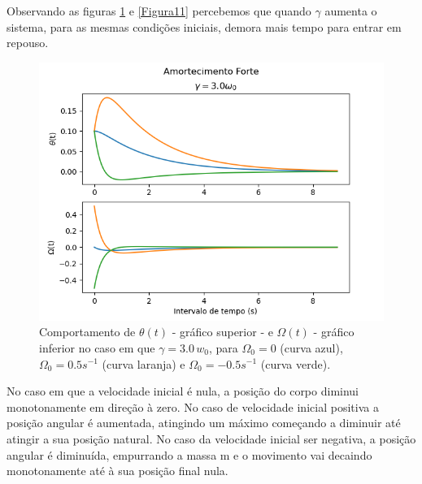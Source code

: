 \documentclass[12pt,openright,twoside,english,brazil]{abntex2}
\begin{document}
Observando as figuras \ref{Figura10} e \ref{Figura11} percebemos que quando $\gamma$ aumenta o sistema, para as mesmas condições iniciais, demora mais tempo para entrar em repouso.
    
\begin{figure}[h]
 \centering
 \includegraphics[width=1.0\linewidth]{forte-1.png}
 \caption{Comportamento de $\theta(t)$ - gráfico superior - e $\Omega(t)$ - gráfico inferior no caso em que $\gamma = 3.0\,  w_0$, para $\Omega_0=0$ (curva azul), $\Omega_0=0.5 s^{-1}$ (curva laranja) e $\Omega_0=-0.5 s^{-1}$ (curva verde).}
 \label{Figura10}
\end{figure}

No caso em que a velocidade inicial é nula, a posição do corpo diminui monotonamente em direção à zero. No caso de velocidade inicial positiva a posição angular é aumentada, atingindo um máximo começando a diminuir até atingir a sua
posição natural. No caso da velocidade inicial ser negativa, a posição angular é diminuída, empurrando a massa m e o movimento vai decaindo monotonamente até à sua posição final nula.
\end{document}
